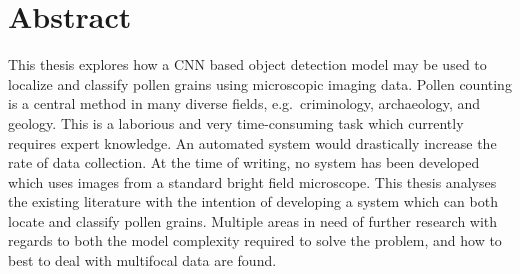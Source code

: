 \chapter*{Abstract}
This thesis explores how a CNN based object detection model may be used to localize and classify pollen grains using microscopic imaging data.
Pollen counting is a central method in many diverse fields, e.g.\ criminology, archaeology, and geology.
This is a laborious and very time-consuming task which currently requires expert knowledge.
An automated system would drastically increase the rate of data collection. 
At the time of writing, no system has been developed which uses images from a standard bright field microscope.
This thesis analyses the existing literature with the intention of developing a system which can both locate and classify pollen grains.
Multiple areas in need of further research with regards to both the model complexity required to solve the problem, and how to best to deal with multifocal data are found.

